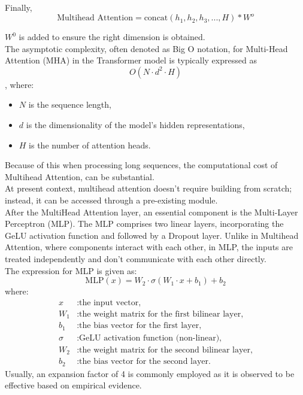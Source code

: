 Finally, \[\text{Multihead Attention} = \text{concat} (h_1, h_2, h_3,...,H)* W^o \]

$W^0$ is added to ensure the right dimension is obtained.\\

The asymptotic complexity, often denoted as Big O notation, for Multi-Head Attention (MHA) in the Transformer model is typically expressed as\[ O(N \cdot d^2 \cdot H)\], where:
\begin{itemize}
  \item $N$ is the sequence length,
  \item $d$ is the dimensionality of the model's hidden representations,
  \item $H$ is the number of attention heads.
\end{itemize}
Because of this when processing long sequences, the computational cost of Multihead Attention, can be substantial.\\

At present context, multihead attention doesn't require building from scratch; instead, it can be accessed through a pre-existing module.\\

After the MultiHead Attention layer, an essential component is the Multi-Layer Perceptron (MLP). The MLP comprises two linear layers, incorporating the GeLU activation function and followed by a Dropout layer. Unlike in Multihead Attention, where components interact with each other, in MLP, the inputs are treated independently and don't communicate with each other directly.\\

The expression for MLP is given as:\\

\[\text{MLP}(x) = W_2 \cdot \sigma(W_1 \cdot x + b_1) + b_2\]
where:
\begin{align*}
    x & : \text{the input vector,} \\
    W_1 & : \text{the weight matrix for the first bilinear layer,} \\
    b_1 & : \text{the bias vector for the first layer,} \\
    \sigma & : \text{GeLU activation function (non-linear),} \\
    W_2 & : \text{the weight matrix for the second bilinear layer,} \\
    b_2 & : \text{the bias vector for the second layer.}
\end{align*}
Usually, an expansion factor of 4 is commonly employed as it is observed to be effective based on empirical evidence.\\
\\

